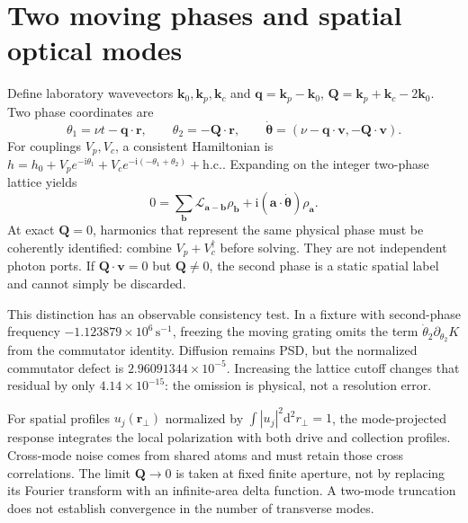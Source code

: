 \documentclass[11pt,a4paper]{article}
\newcommand{\dd}{\mathrm d}
\newcommand{\ii}{\mathrm i}
\begin{document}
\section{Two moving phases and spatial optical modes}
\label{sec:gc-kinetic}

Define laboratory wavevectors $\mathbf k_0,\mathbf k_p,\mathbf k_c$ and
$\mathbf q=\mathbf k_p-\mathbf k_0$,
$\mathbf Q=\mathbf k_p+\mathbf k_c-2\mathbf k_0$. Two phase coordinates are
\begin{equation}
 \theta_1=\nu t-\mathbf q\cdot\mathbf r,\qquad
 \theta_2=-\mathbf Q\cdot\mathbf r,\qquad
 \dot{\boldsymbol\theta}
 =(\nu-\mathbf q\cdot\mathbf v,-\mathbf Q\cdot\mathbf v).
 \label{eq:gc-moving-phases}
\end{equation}
For couplings $V_p,V_c$, a consistent Hamiltonian is
$h=h_0+V_pe^{-\ii\theta_1}+V_ce^{-\ii(-\theta_1+\theta_2)}+\mathrm{h.c.}$.
Expanding on the integer two-phase lattice yields
\begin{equation}
 0=\sum_{\mathbf b}\mathcal L_{\mathbf a-\mathbf b}\rho_{\mathbf b}
    +\ii(\mathbf a\cdot\dot{\boldsymbol\theta})\rho_{\mathbf a}.
 \label{eq:gc-kinetic-lattice}
\end{equation}
At exact $\mathbf Q=0$, harmonics that represent the same physical phase
must be coherently identified: combine $V_p+V_c^\dagger$ before solving.
They are not independent photon ports. If $\mathbf Q\cdot\mathbf v=0$
but $\mathbf Q\ne0$, the second phase is a static spatial label and cannot
simply be discarded.

This distinction has an observable consistency test. In a fixture with
second-phase frequency $-1.123879\times10^6\,\mathrm{s}^{-1}$, freezing the
moving grating omits the term $\dot\theta_2\partial_{\theta_2}K$ from the
commutator identity. Diffusion remains PSD, but the normalized commutator
defect is $2.96091344\times10^{-5}$. Increasing the lattice cutoff changes
that residual by only $4.14\times10^{-15}$: the omission is physical, not a
resolution error.

For spatial profiles $u_j(\mathbf r_\perp)$ normalized by
$\int |u_j|^2\dd^2r_\perp=1$, the mode-projected response integrates the
local polarization with both drive and collection profiles. Cross-mode noise
comes from shared atoms and must retain those cross correlations. The limit
$\mathbf Q\to0$ is taken at fixed finite aperture, not by replacing its
Fourier transform with an infinite-area delta function. A two-mode truncation
does not establish convergence in the number of transverse modes.
\end{document}

